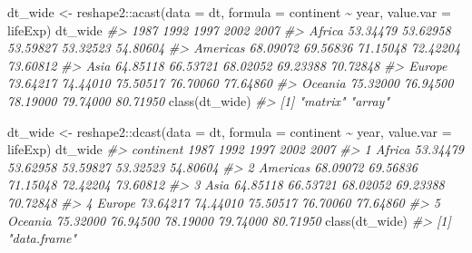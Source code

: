 \documentclass[
]{book}
\newenvironment{Shaded}{\begin{snugshade}}{\end{snugshade}}
\newcommand{\AttributeTok}[1]{\textcolor[rgb]{0.77,0.63,0.00}{#1}}
\newcommand{\CommentTok}[1]{\textcolor[rgb]{0.56,0.35,0.01}{\textit{#1}}}
\newcommand{\FunctionTok}[1]{\textcolor[rgb]{0.00,0.00,0.00}{#1}}
\newcommand{\NormalTok}[1]{#1}
\newcommand{\OtherTok}[1]{\textcolor[rgb]{0.56,0.35,0.01}{#1}}
\newcommand{\SpecialCharTok}[1]{\textcolor[rgb]{0.00,0.00,0.00}{#1}}
\newcommand{\StringTok}[1]{\textcolor[rgb]{0.31,0.60,0.02}{#1}}
\begin{document}
\begin{Shaded}
\begin{Highlighting}[]
\NormalTok{dt\_wide }\OtherTok{\textless{}{-}}\NormalTok{ reshape2}\SpecialCharTok{::}\FunctionTok{acast}\NormalTok{(}\AttributeTok{data =}\NormalTok{ dt, }
                           \AttributeTok{formula =}\NormalTok{ continent }\SpecialCharTok{\textasciitilde{}}\NormalTok{ year, }
                           \AttributeTok{value.var =} \StringTok{\textquotesingle{}lifeExp\textquotesingle{}}\NormalTok{)}
\NormalTok{dt\_wide}
\CommentTok{\#\textgreater{}              1987     1992     1997     2002     2007}
\CommentTok{\#\textgreater{} Africa   53.34479 53.62958 53.59827 53.32523 54.80604}
\CommentTok{\#\textgreater{} Americas 68.09072 69.56836 71.15048 72.42204 73.60812}
\CommentTok{\#\textgreater{} Asia     64.85118 66.53721 68.02052 69.23388 70.72848}
\CommentTok{\#\textgreater{} Europe   73.64217 74.44010 75.50517 76.70060 77.64860}
\CommentTok{\#\textgreater{} Oceania  75.32000 76.94500 78.19000 79.74000 80.71950}
\FunctionTok{class}\NormalTok{(dt\_wide)}
\CommentTok{\#\textgreater{} [1] "matrix" "array"}

\NormalTok{dt\_wide }\OtherTok{\textless{}{-}}\NormalTok{ reshape2}\SpecialCharTok{::}\FunctionTok{dcast}\NormalTok{(}\AttributeTok{data =}\NormalTok{ dt, }
                           \AttributeTok{formula =}\NormalTok{ continent }\SpecialCharTok{\textasciitilde{}}\NormalTok{ year, }
                           \AttributeTok{value.var =} \StringTok{\textquotesingle{}lifeExp\textquotesingle{}}\NormalTok{)}
\NormalTok{dt\_wide}
\CommentTok{\#\textgreater{}   continent     1987     1992     1997     2002     2007}
\CommentTok{\#\textgreater{} 1    Africa 53.34479 53.62958 53.59827 53.32523 54.80604}
\CommentTok{\#\textgreater{} 2  Americas 68.09072 69.56836 71.15048 72.42204 73.60812}
\CommentTok{\#\textgreater{} 3      Asia 64.85118 66.53721 68.02052 69.23388 70.72848}
\CommentTok{\#\textgreater{} 4    Europe 73.64217 74.44010 75.50517 76.70060 77.64860}
\CommentTok{\#\textgreater{} 5   Oceania 75.32000 76.94500 78.19000 79.74000 80.71950}
\FunctionTok{class}\NormalTok{(dt\_wide)}
\CommentTok{\#\textgreater{} [1] "data.frame"}


\end{Highlighting}
\end{Shaded}
\end{document}
